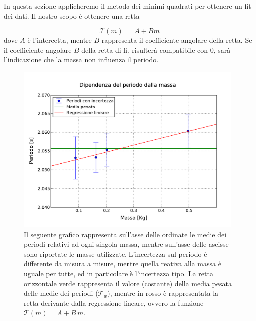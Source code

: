 In questa sezione applicheremo il metodo dei minimi quadrati per ottenere un fit dei dati.
Il nostro scopo è ottenere una retta

\begin{equation}
	\mathcal{T}(m) \,=\, A + B m 
\end{equation}
%
dove $A$ è l'intercetta, mentre $B$ rappresenta il coefficiente angolare della retta. Se il coefficiente angolare $B$ della 
retta di fit risulterà compatibile con 0, sarà l'indicazione che la massa non influenza il periodo. 

\begin{figure}
    \centering
    \includegraphics[width=110mm]{immagini/masse.pdf}
    \caption{Il seguente grafico rappresenta sull'asse delle ordinate le medie dei periodi relativi ad ogni
        singola massa, mentre sull'asse delle ascisse sono riportate le masse utilizzate. L'incertezza sul periodo
        è differente da misura a misure, mentre quella reativa alla massa è uguale per tutte, ed in particolare è
        l'incertezza tipo. La retta orizzontale verde rappresenta il valore (costante) della media pesata delle medie
        dei periodi ($\mathcal{T}_w$), mentre in rosso è rappresentata la retta derivante dalla regressione lineare,
        ovvero la funzione $\mathcal{T}(m) = A + B\,m$.}
    \label{fig:masse_periodi}
\end{figure}


